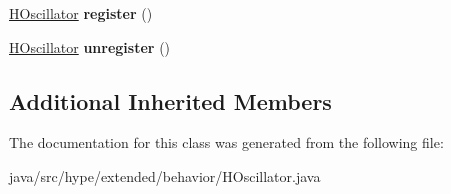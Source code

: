 \begin{DoxyCompactItemize}
\item 
\hypertarget{classhype_1_1extended_1_1behavior_1_1_h_oscillator_acc7aef28dc221ad7601848cdef28099b}{\hyperlink{classhype_1_1extended_1_1behavior_1_1_h_oscillator}{H\-Oscillator} {\bfseries register} ()}\label{classhype_1_1extended_1_1behavior_1_1_h_oscillator_acc7aef28dc221ad7601848cdef28099b}

\item 
\hypertarget{classhype_1_1extended_1_1behavior_1_1_h_oscillator_a3608cfe87cda925418928da75b044d90}{\hyperlink{classhype_1_1extended_1_1behavior_1_1_h_oscillator}{H\-Oscillator} {\bfseries unregister} ()}\label{classhype_1_1extended_1_1behavior_1_1_h_oscillator_a3608cfe87cda925418928da75b044d90}

\end{DoxyCompactItemize}
\subsection*{Additional Inherited Members}


The documentation for this class was generated from the following file\-:\begin{DoxyCompactItemize}
\item 
java/src/hype/extended/behavior/H\-Oscillator.\-java\end{DoxyCompactItemize}
